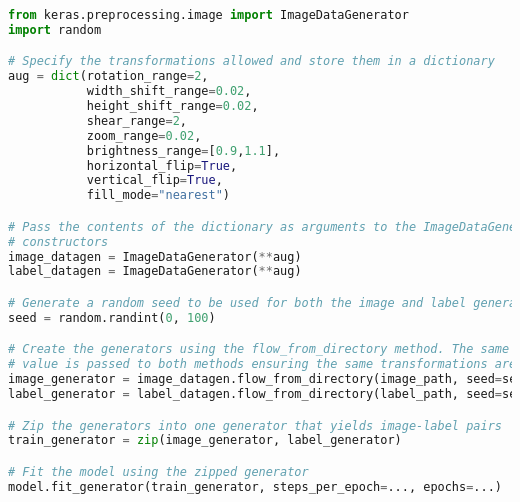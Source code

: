 \begin{lstlisting}[float={ht},caption={A simplified example of online augmentation implemented using the \texttt{ImageDataGenerator} class.},label={lst:augment},language=Python,upquote=true]
from keras.preprocessing.image import ImageDataGenerator
import random

# Specify the transformations allowed and store them in a dictionary
aug = dict(rotation_range=2,
           width_shift_range=0.02,
           height_shift_range=0.02,
           shear_range=2,
           zoom_range=0.02,
           brightness_range=[0.9,1.1],
           horizontal_flip=True,
           vertical_flip=True,
           fill_mode="nearest")

# Pass the contents of the dictionary as arguments to the ImageDataGenerator
# constructors
image_datagen = ImageDataGenerator(**aug)
label_datagen = ImageDataGenerator(**aug)

# Generate a random seed to be used for both the image and label generators
seed = random.randint(0, 100)

# Create the generators using the flow_from_directory method. The same seed
# value is passed to both methods ensuring the same transformations are applied.
image_generator = image_datagen.flow_from_directory(image_path, seed=seed, ...)
label_generator = label_datagen.flow_from_directory(label_path, seed=seed, ...)

# Zip the generators into one generator that yields image-label pairs
train_generator = zip(image_generator, label_generator)

# Fit the model using the zipped generator
model.fit_generator(train_generator, steps_per_epoch=..., epochs=...)
\end{lstlisting}